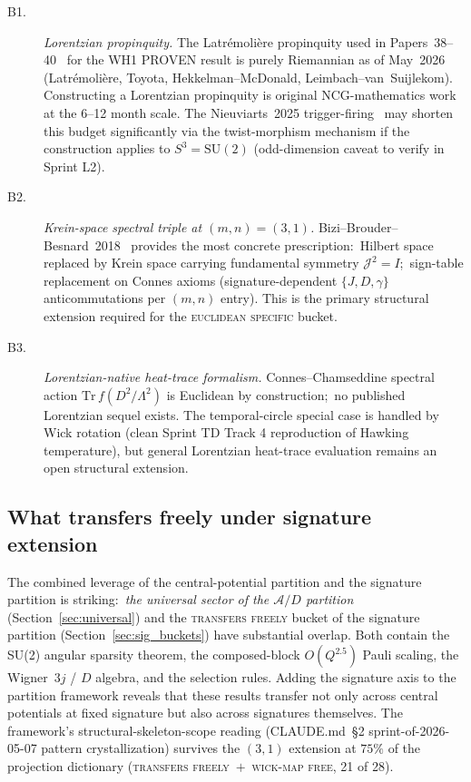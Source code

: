 \documentclass[twocolumn,pra,amsmath,amssymb,superscriptaddress]{revtex4-2}
\begin{document}
\begin{description}
\item[B1\@.] \emph{Lorentzian propinquity.}  The Latr\'emoli\`ere
  propinquity used in Papers~38--40~\cite{paper38} for the WH1 PROVEN
  result is purely Riemannian as of May~2026 (Latr\'emoli\`ere,
  Toyota, Hekkelman--McDonald, Leimbach--van~Suijlekom).  Constructing
  a Lorentzian propinquity is original NCG-mathematics work at the
  6--12 month scale.  The Nieuviarts~2025
  trigger-firing~\cite{nieuviarts2025a, nieuviarts2025b} may shorten
  this budget significantly via the twist-morphism mechanism if the
  construction applies to $S^3 = \mathrm{SU}(2)$ (odd-dimension caveat
  to verify in Sprint L2).
\item[B2\@.] \emph{Krein-space spectral triple at $(m, n) = (3, 1)$.}
  Bizi--Brouder--Besnard~2018~\cite{bizi_brouder_besnard2018} provides
  the most concrete prescription:\ Hilbert space replaced by Krein
  space carrying fundamental symmetry $\mathcal{J}^2 = I$;\
  sign-table replacement on Connes axioms (signature-dependent
  $\{J, D, \gamma\}$ anticommutations per $(m, n)$ entry).  This is the
  primary structural extension required for the
  \textsc{euclidean specific} bucket.
\item[B3\@.] \emph{Lorentzian-native heat-trace formalism.}
  Connes--Chamseddine spectral action
  $\mathrm{Tr}\,f(D^2/\Lambda^2)$ is Euclidean by construction;\
  no published Lorentzian sequel exists.  The temporal-circle special
  case is handled by Wick rotation (clean Sprint TD Track 4 reproduction
  of Hawking temperature), but general Lorentzian heat-trace evaluation
  remains an open structural extension.
\end{description}

\subsection{What transfers freely under signature extension}
\label{sec:sig_transfers}

The combined leverage of the central-potential partition and the
signature partition is striking:\ \emph{the universal sector of the
$\mathcal{A}/D$ partition} (Section~\ref{sec:universal}) and the
\textsc{transfers freely} bucket of the signature partition
(Section~\ref{sec:sig_buckets}) have substantial overlap.  Both
contain the SU(2) angular sparsity theorem, the composed-block
$O(Q^{2.5})$ Pauli scaling, the Wigner~$3j$ / $D$ algebra, and the
selection rules.  Adding the signature axis to the partition
framework reveals that these results transfer not only across central
potentials at fixed signature but also across signatures themselves.
The framework's structural-skeleton-scope reading (CLAUDE.md~\S2
sprint-of-2026-05-07 pattern crystallization) survives the $(3, 1)$
extension at $75\%$ of the projection dictionary
(\textsc{transfers freely}~$+$~\textsc{wick-map free}, 21 of 28).
\end{document}
